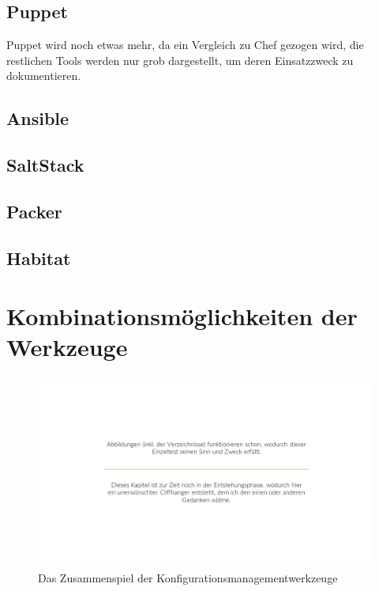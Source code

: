 \subsection{Puppet}
\label{sub:puppet}
Puppet wird noch etwas mehr, da ein Vergleich zu Chef gezogen wird, die restlichen Tools werden nur grob dargestellt, um deren Einsatzzweck zu dokumentieren.

\subsection{Ansible}
\label{sub:ansible}

\subsection{SaltStack}
\label{sub:saltstack}

\subsection{Packer}
\label{sub:packer}

\subsection{Habitat}
\label{sub:habitat}


\section{Kombinationsmöglichkeiten der Werkzeuge}
\label{sec:werkzeugkombinationsmoeglichkeiten}
\begin{figure}[htbp]
    \centering
    \includegraphics[width=0.9\linewidth,trim=190 160 190 160,clip]{images/cliffhanger}
    \caption{Das Zusammenspiel der Konfigurationsmanagementwerkzeuge}
\label{fig:konfigurationsmanagement-kombinationen}
\end{figure}
